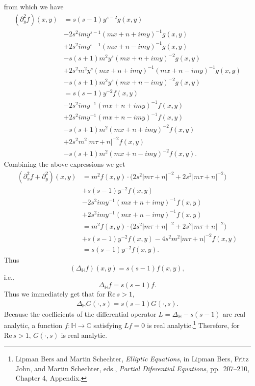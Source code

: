 \documentclass{article}
\def\Re{\ensuremath{\mathrm{Re}}\,}
\theoremstyle{definition}
\begin{document}
from which we have
\begin{align*}
(\partial_y^2 f)(x,y)&=s(s-1)y^{s-2} g(x,y)\\
&-2s^2 im y^{s-1}(mx+n+imy)^{-1} g(x,y)\\
&+2s^2 im y^{s-1} (mx+n-imy)^{-1} g(x,y)\\
&-s(s+1)m^2 y^s (mx+n+imy)^{-2} g(x,y)\\
&+2s^2m^2y^s(mx+n+imy)^{-1}(mx+n-imy)^{-1} g(x,y)\\
&-s(s+1)m^2 y^s(mx+n-imy)^{-2} g(x,y)\\
&=s(s-1) y^{-2} f(x,y)\\
&-2s^2imy^{-1} (mx+n+imy)^{-1} f(x,y)\\
&+2s^2imy^{-1}(mx+n-imy)^{-1} f(x,y)\\
&-s(s+1)m^2(mx+n+imy)^{-2} f(x,y)\\
&+2s^2m^2 |m\tau+n|^{-2} f(x,y)\\
&-s(s+1)m^2 (mx+n-imy)^{-2} f(x,y).
\end{align*}
Combining the above expressions we get
\begin{align*}
(\partial_x^2 f+\partial_y^2)(x,y)&=m^2 f(x,y) \cdot \bigg(2s^2|m\tau+n|^{-2}
+2s^2|m\tau+n|^{-2}\bigg)\\
&+s(s-1)y^{-2} f(x,y)\\
&-2s^2imy^{-1} (mx+n+imy)^{-1} f(x,y)\\
&+2s^2imy^{-1}(mx+n-imy)^{-1} f(x,y)\\
&=m^2 f(x,y) \cdot \bigg(2s^2|m\tau+n|^{-2}
+2s^2|m\tau+n|^{-2}\bigg)\\
&+s(s-1)y^{-2}f(x,y)
-4s^2m^2|m\tau+n|^{-2} f(x,y)\\
&=s(s-1)y^{-2}f(x,y).
\end{align*}
Thus
\[
(\Delta_{\mathbb{H}} f)(x,y) = s(s-1)f(x,y),
\]
i.e.,
\[
\Delta_{\mathbb{H}} f = s(s-1)f.
\]
Thus we immediately get that for $\Re s>1$,
\begin{align*}
\Delta_{\mathbb{H}} G(\cdot,s) = s(s-1) G(\cdot,s).
\end{align*}
Because the coefficients of the differential operator $L=\Delta_{\mathbb{H}}-s(s-1)$ are real analytic, a function $f:\mathbb{H} \to \mathbb{C}$
satisfying $Lf=0$ is real analytic.\footnote{Lipman Bers and Martin Schechter, {\em Elliptic Equations}, in
Lipman Bers, Fritz John, and Martin Schechter, eds., {\em Partial Diferential Equations},
pp.~207--210, Chapter 4, Appendix.} Therefore, for $\Re s>1$, $G(\cdot,s)$ is real analytic.
\end{document}
